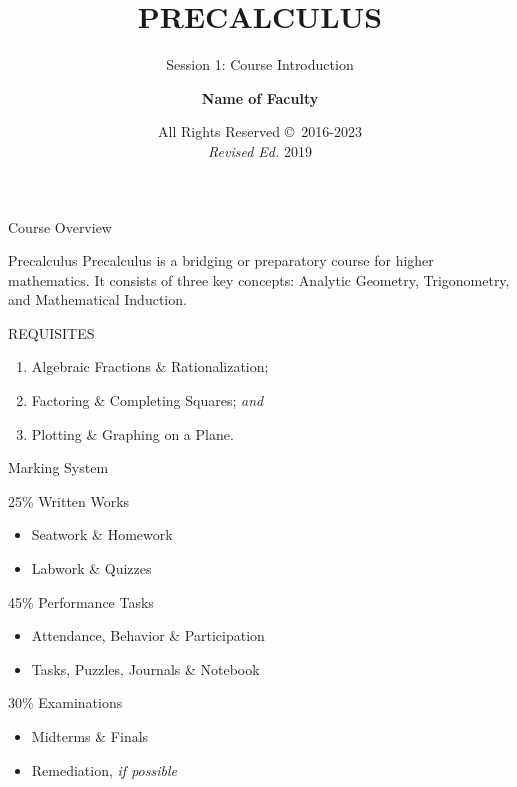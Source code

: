 \documentclass[12pt]{beamer}
\begin{document}
\title{\textbf{PRECALCULUS}}
\subtitle{Session 1: Course Introduction}
\author{\textbf{Name of Faculty}}
\date{All Rights Reserved \copyright \, 2016-2023 \\ \textit{Revised Ed.} 2019}

\begin{frame}
  \maketitle
\end{frame}

\begin{frame}{Course Overview}
  \begin{block}{Precalculus}
  \justifying
    Precalculus is a bridging or preparatory course for higher mathematics. It consists of three key concepts: Analytic Geometry, Trigonometry, and Mathematical Induction.
  \end{block}
  REQUISITES
  \begin{enumerate}
   \item Algebraic Fractions \& Rationalization;
   \item Factoring \& Completing Squares; \textit{and}
   \item Plotting \& Graphing on a Plane.
  \end{enumerate}
\end{frame}

\begin{frame}{Marking System}
  \begin{block}{25\% Written Works}
   \begin{itemize}
    \item Seatwork \& Homework
    \item Labwork \& Quizzes
   \end{itemize}
  \end{block}

  \begin{block}{45\% Performance Tasks}
  \begin{itemize}
   \item Attendance, Behavior \& Participation
   \item Tasks, Puzzles, Journals \& Notebook
  \end{itemize}
  \end{block}

  \begin{block}{30\% Examinations}
   \begin{itemize}
    \item Midterms \& Finals
    \item Remediation, \textit{if possible}
   \end{itemize}
  \end{block}

\end{frame}
\end{document}
